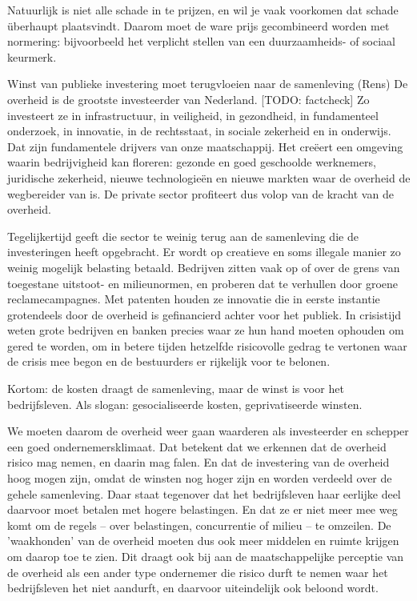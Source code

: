 Natuurlijk is niet alle schade in te prijzen, en wil je vaak voorkomen dat schade überhaupt plaatsvindt. Daarom moet de ware prijs gecombineerd worden met normering: bijvoorbeeld het verplicht stellen van een duurzaamheids- of sociaal keurmerk.

Winst van publieke investering moet terugvloeien naar de samenleving (Rens)
De overheid is de grootste investeerder van Nederland. [TODO: factcheck] Zo investeert ze in infrastructuur, in veiligheid, in gezondheid, in fundamenteel onderzoek, in innovatie, in de rechtsstaat, in sociale zekerheid en in onderwijs. Dat zijn fundamentele drijvers van onze maatschappij. Het creëert een omgeving waarin bedrijvigheid kan floreren: gezonde en goed geschoolde werknemers, juridische zekerheid, nieuwe technologieën en nieuwe markten waar de overheid de wegbereider van is. De private sector profiteert dus volop van de kracht van de overheid.

Tegelijkertijd geeft die sector te weinig terug aan de samenleving die de investeringen heeft opgebracht. Er wordt op creatieve en soms illegale manier zo weinig mogelijk belasting betaald. Bedrijven zitten vaak op of over de grens van toegestane uitstoot- en milieunormen, en proberen dat te verhullen door groene reclamecampagnes. Met patenten houden ze innovatie die in eerste instantie grotendeels door de overheid is gefinancierd achter voor het publiek. In crisistijd weten grote bedrijven en banken precies waar ze hun hand moeten ophouden om gered te worden, om in betere tijden hetzelfde risicovolle gedrag te vertonen waar de crisis mee begon en de bestuurders er rijkelijk voor te belonen.

Kortom: de kosten draagt de samenleving, maar de winst is voor het bedrijfsleven. Als slogan: gesocialiseerde kosten, geprivatiseerde winsten.

We moeten daarom de overheid weer gaan waarderen als investeerder en schepper een goed ondernemersklimaat. Dat betekent dat we erkennen dat de overheid risico mag nemen, en daarin mag falen. En dat de investering van de overheid hoog mogen zijn, omdat de winsten nog hoger zijn en worden verdeeld over de gehele samenleving. Daar staat tegenover dat het bedrijfsleven haar eerlijke deel daarvoor moet betalen met hogere belastingen. En dat ze er niet meer mee weg komt om de regels – over belastingen, concurrentie of milieu – te omzeilen. De 'waakhonden' van de overheid moeten dus ook meer middelen en ruimte krijgen om daarop toe te zien. Dit draagt ook bij aan de maatschappelijke perceptie van de overheid als een ander type ondernemer die risico durft te nemen waar het bedrijfsleven het niet aandurft, en daarvoor uiteindelijk ook beloond wordt.

